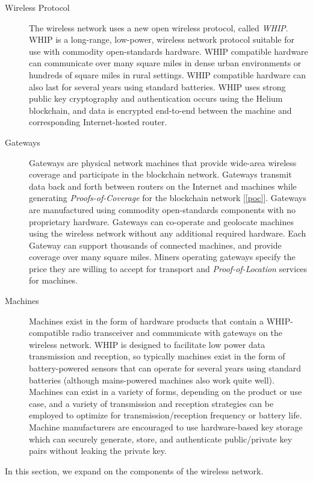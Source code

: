 \documentclass[10pt, nonatbib, nocopyrightspace, reprint]{sigplanconf}
\newcommand{\secref}[1]{[\autoref{#1}]}
\begin{document}
\begin{description}
    \item [Wireless Protocol] The wireless network uses a new open wireless protocol, called \emph{WHIP}. WHIP is a long-range, low-power, wireless network protocol suitable for use with commodity open-standards hardware. WHIP compatible hardware can communicate over many square miles in dense urban environments or hundreds of square miles in rural settings. WHIP compatible hardware can also last for several years using standard batteries. WHIP uses strong public key cryptography and authentication occurs using the Helium blockchain, and data is encrypted end-to-end between the machine and corresponding Internet-hosted router.

    \item [Gateways] Gateways are physical network machines that provide wide-area wireless coverage and participate in the blockchain network. Gateways transmit data back and forth between routers on the Internet and machines while generating \emph{Proofs-of-Coverage} for the blockchain network \secref{poc}. Gateways are manufactured using commodity open-standards components with no proprietary hardware. Gateways can co-operate and geolocate machines using the wireless network without any additional required hardware. Each Gateway can support thousands of connected machines, and provide coverage over many square miles. Miners operating gateways specify the price they are willing to accept for transport and \emph{Proof-of-Location} services for machines.

    \item [Machines] Machines exist in the form of hardware products that contain a WHIP-compatible radio transceiver and communicate with gateways on the wireless network. WHIP is designed to facilitate low power data transmission and reception, so typically machines exist in the form of battery-powered sensors that can operate for several years using standard batteries (although mains-powered machines also work quite well). Machines can exist in a variety of forms, depending on the product or use case, and a variety of transmission and reception strategies can be employed to optimize for transmission/reception frequency or battery life. Machine manufacturers are encouraged to use hardware-based key storage which can securely generate, store, and authenticate public/private key pairs without leaking the private key.
\end{description}

In this section, we expand on the components of the wireless network.
\end{document}
